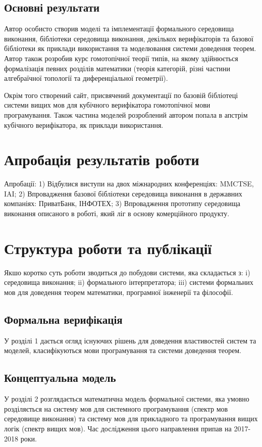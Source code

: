 \subsection{Основні результати}
Автор особисто створив моделі та імплементації формального середовища виконання,
бібліотеки середовища виконання, декількох верифікаторів та базової бібліотеки
як приклади використання та моделювання системи доведення теорем. Автор також
розробив курс гомотопічної теорії типів, на якому здійнюється формалізація
певних розділів математики (теорія категорій, різні частини алгебраїчної
топології та диференціальної геометрії).

Окрім того створений сайт, присвячений документації по базовій бібліотеці системи вищих мов
для кубічного верифікатора гомотопічної мови програмування. Також частина
моделей розроблений автором попала в апстрім кубічного верифікатора,
як приклади використання.

\section{Апробація результатів роботи}
Апробації:
1) Відбулися виступи на двох міжнародних конференціях: MMCTSE, IAI;
2) Впровадження базової бібліотеки середовища виконання в державних компаніях: ПриватБанк, ІНФОТЕХ;
3) Впровадження прототипу середовища виконання описаного в роботі, який ліг в основу комерційного продукту.

\section{Структура роботи та публікації}
Якшо коротко суть роботи зводиться до побудови системи, яка складається з:
i) середовища виконання; ii) формального інтерпретатора; iii) системи формальних мов
для доведення теорем математики, програмної інженерії та філософії.

\subsection*{Формальна верифікація}
У розділі 1 дається огляд існуючих рішень для доведення
властивостей систем та моделей, класифікуються мови програмування
та системи доведення теорем.

\subsection*{Концептуальна модель}
У розділі 2 розглядається математична модель формальної системи,
яка умовно розділяється на систему мов для системного
програмування (спектр мов середовище виконання) та систему мов для
прикладного та програмування вищих логік (спектр вищих мов).
Час дослідження цього направлення припав на 2017-2018 роки.

